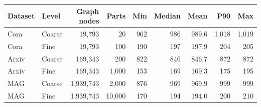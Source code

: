 \begin{tabular}{llrrrrrrr}
\toprule
\textbf{Dataset} & \textbf{Level} & \textbf{Graph nodes} & \textbf{Parts} & \textbf{Min} & \textbf{Median} & \textbf{Mean} & \textbf{P90} & \textbf{Max} \\
\midrule
Cora & Coarse & 19,793 & 20 & 962 & 986 & 989.6 & 1,018 & 1,019 \\
Cora & Fine & 19,793 & 100 & 190 & 197 & 197.9 & 204 & 205 \\
Arxiv & Coarse & 169,343 & 200 & 822 & 846 & 846.7 & 872 & 872 \\
Arxiv & Fine & 169,343 & 1,000 & 153 & 169 & 169.3 & 175 & 195 \\
MAG & Coarse & 1,939,743 & 2,000 & 876 & 969 & 969.9 & 999 & 999 \\
MAG & Fine & 1,939,743 & 10,000 & 170 & 194 & 194.0 & 200 & 210 \\
\bottomrule
\end{tabular}
